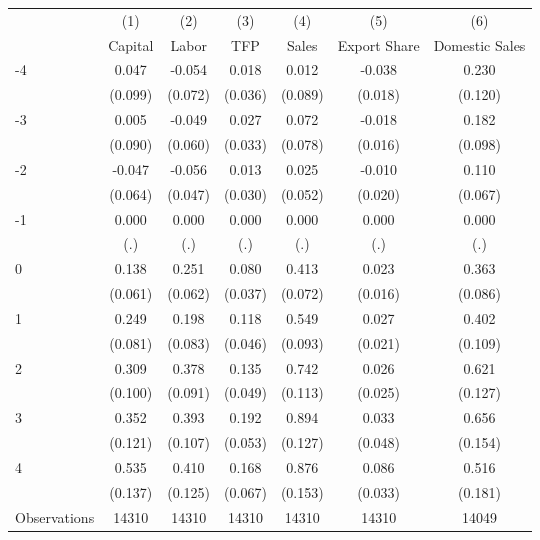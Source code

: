 \begin{tabular}{l*{6}{c}}
\hline\hline
                    &\multicolumn{1}{c}{(1)}&\multicolumn{1}{c}{(2)}&\multicolumn{1}{c}{(3)}&\multicolumn{1}{c}{(4)}&\multicolumn{1}{c}{(5)}&\multicolumn{1}{c}{(6)}\\
                    &\multicolumn{1}{c}{Capital}&\multicolumn{1}{c}{Labor}&\multicolumn{1}{c}{TFP}&\multicolumn{1}{c}{Sales}&\multicolumn{1}{c}{Export Share}&\multicolumn{1}{c}{Domestic Sales}\\
\hline
-4                  &       0.047&      -0.054&       0.018&       0.012&      -0.038&       0.230\\
                    &     (0.099)&     (0.072)&     (0.036)&     (0.089)&     (0.018)&     (0.120)\\
[1em]
-3                  &       0.005&      -0.049&       0.027&       0.072&      -0.018&       0.182\\
                    &     (0.090)&     (0.060)&     (0.033)&     (0.078)&     (0.016)&     (0.098)\\
[1em]
-2                  &      -0.047&      -0.056&       0.013&       0.025&      -0.010&       0.110\\
                    &     (0.064)&     (0.047)&     (0.030)&     (0.052)&     (0.020)&     (0.067)\\
[1em]
-1                  &       0.000&       0.000&       0.000&       0.000&       0.000&       0.000\\
                    &         (.)&         (.)&         (.)&         (.)&         (.)&         (.)\\
[1em]
0                   &       0.138&       0.251&       0.080&       0.413&       0.023&       0.363\\
                    &     (0.061)&     (0.062)&     (0.037)&     (0.072)&     (0.016)&     (0.086)\\
[1em]
1                   &       0.249&       0.198&       0.118&       0.549&       0.027&       0.402\\
                    &     (0.081)&     (0.083)&     (0.046)&     (0.093)&     (0.021)&     (0.109)\\
[1em]
2                   &       0.309&       0.378&       0.135&       0.742&       0.026&       0.621\\
                    &     (0.100)&     (0.091)&     (0.049)&     (0.113)&     (0.025)&     (0.127)\\
[1em]
3                   &       0.352&       0.393&       0.192&       0.894&       0.033&       0.656\\
                    &     (0.121)&     (0.107)&     (0.053)&     (0.127)&     (0.048)&     (0.154)\\
[1em]
4                   &       0.535&       0.410&       0.168&       0.876&       0.086&       0.516\\
                    &     (0.137)&     (0.125)&     (0.067)&     (0.153)&     (0.033)&     (0.181)\\
\hline
Observations        &       14310&       14310&       14310&       14310&       14310&       14049\\
\hline\hline
\end{tabular}
